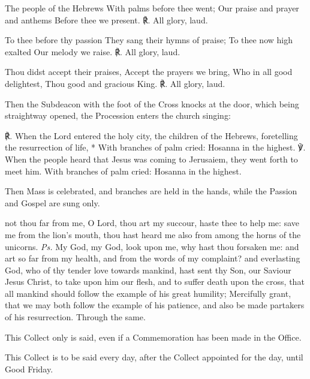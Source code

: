 The people of the Hebrews With palms before thee went; Our praise and prayer and anthems Before thee we present. ℟. All glory, laud.\par
To thee before thy passion They sang their hymns of praise; To thee now high exalted Our melody we raise. ℟. All glory, laud.\par
Thou didst accept their praises, Accept the prayers we bring, Who in all good delightest, Thou good and gracious King. ℟. All glory, laud.\par
\begin{rubric}
    Then the Subdeacon with the foot of the Cross knocks at the door, which being straightway opened, the Procession enters the church singing:
\end{rubric}\par\noindent
℟. When the Lord entered the holy city, the children of the Hebrews, foretelling the resurrection of life, * With branches of palm cried: Hosanna in the highest. ℣. When the people heard that Jesus was coming to Jerusaiem, they went forth to meet him. With branches of palm cried: Hosanna in the highest.
\begin{rubric}
    Then Mass is celebrated, and branches are held in the hands, while the Passion and Gospel are sung only.
\end{rubric}
\introit
{} not thou far from me, O Lord, thou art my succour, haste thee to help me: save me from the lion's mouth, thou hast heard me also from among the horns of the unicorns. \textit{Ps.} My God, my God, look upon me, why hast thou forsaken me: and art so far from my health, and from the words of my complaint? 
\collect
{} and everlasting God, who of thy tender love towards mankind, hast sent thy Son, our Saviour Jesus Christ, to take upon him our flesh, and to suffer death upon the cross, that all mankind should follow the example of his great humility; Mercifully grant, that we may both follow the example of his patience, and also be made partakers of his resurrection. Through the same.
\begin{rubric}
    This Collect only is said, even if a Commemoration has been made in the Office.
\end{rubric}
\begin{rubric}
    This Collect is to be said every day, after the Collect appointed for the day, until Good Friday.
\end{rubric}
